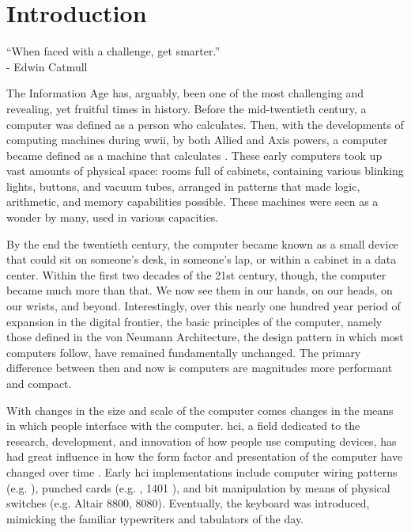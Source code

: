 \chapter{Introduction}
\label{chap:introduction}

\begin{center}
    ``When faced with a challenge, get smarter.'' \\
    - Edwin Catmull \cite{Catmull2014}
\end{center}

\par The Information Age has, arguably, been one of the most challenging and revealing, yet fruitful times in history. Before the mid-twentieth century, a computer was defined as a person who calculates. Then, with the developments of computing machines during \gls{wwii}, by both Allied and Axis powers, a computer became defined as a machine that calculates \cite{Palfreman1992}. These early computers took up vast amounts of physical space: rooms full of cabinets, containing various blinking lights, buttons, and vacuum tubes, arranged in patterns that made logic, arithmetic, and memory capabilities possible. These machines were seen as a wonder by many, used in various capacities.

\par By the end the twentieth century, the computer became known as a small device that could sit on someone's desk, in someone's lap, or within a cabinet in a data center. Within the first two decades of the 21st century, though, the computer became much more than that. We now see them in our hands, on our heads, on our wrists, and beyond. Interestingly, over this nearly one hundred year period of expansion in the digital frontier, the basic principles of the computer, namely those defined in the von Neumann Architecture, the design pattern in which most computers follow, have remained fundamentally unchanged. The primary difference between then and now is computers are magnitudes more performant and compact.

\par With changes in the size and scale of the computer comes changes in the means in which people interface with the computer. \gls{hci}, a field dedicated to the research, development, and innovation of how people use computing devices, has had great influence in how the form factor and presentation of the computer have changed over time \cite{Hartson1989}. Early \gls{hci} implementations include computer wiring patterns (e.g. ), punched cards (e.g.  \cite{Eckert1951},  1401 \cite{Garner2010}), and bit manipulation by means of physical switches (e.g. Altair 8800,  8080). Eventually, the keyboard was introduced, mimicking the familiar typewriters and tabulators of the day.

